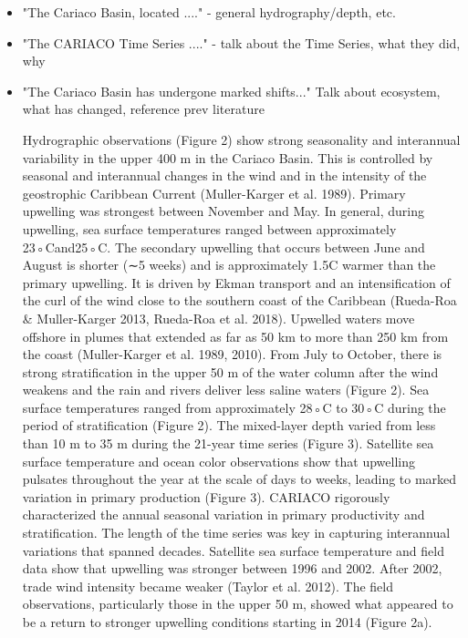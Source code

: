 \documentclass[draft]{agujournal2019}
\begin{document}
    \begin{itemize}
    
        
        \item "The Cariaco Basin, located ...." - general hydrography/depth, etc.
    
        \item "The CARIACO Time Series ...." - talk about the Time Series, what they did, why
    
        \item "The Cariaco Basin has undergone marked shifts..." Talk about ecosystem, what has changed, reference prev literature

        Hydrographic observations (Figure 2) show strong seasonality and interannual variability in the upper 400 m in the Cariaco Basin. This is controlled by seasonal and interannual changes in the wind and in the intensity of the geostrophic Caribbean Current (Muller-Karger et al. 1989). Primary upwelling was strongest between November and May. In general, during upwelling, sea surface temperatures ranged between approximately 23◦Cand25◦C. The secondary upwelling that occurs between June and August is shorter (∼5 weeks) and is approximately 1.5\°C warmer than the primary upwelling. It is driven by Ekman transport and an intensification of the curl of the wind close to the southern coast of the Caribbean (Rueda-Roa \& Muller-Karger 2013, Rueda-Roa et al. 2018). Upwelled waters move offshore in plumes that extended as far as 50 km to more than 250 km from the coast (Muller-Karger et al. 1989, 2010). From July to October, there is strong stratification in the upper 50 m of the water column after the wind weakens and the rain and rivers deliver less saline waters (Figure 2).
        Sea surface temperatures ranged from approximately 28◦C to 30◦C during the period of stratification (Figure 2). The mixed-layer depth varied from less than 10 m to 35 m during the 21-year time series (Figure 3). Satellite sea surface temperature and ocean color observations show that upwelling pulsates throughout the year at the scale of days to weeks, leading to marked variation in primary production (Figure 3). CARIACO rigorously characterized the annual seasonal variation in primary productivity and stratification. The length of the time series was key in capturing interannual variations that spanned decades. Satellite sea surface temperature and field data show that upwelling was stronger between 1996 and 2002. After 2002, trade wind intensity became weaker (Taylor et al. 2012).
        The field observations, particularly those in the upper 50 m, showed what appeared to be a return to stronger upwelling conditions starting in 2014 (Figure 2a).


\end{itemize}
\end{document}
